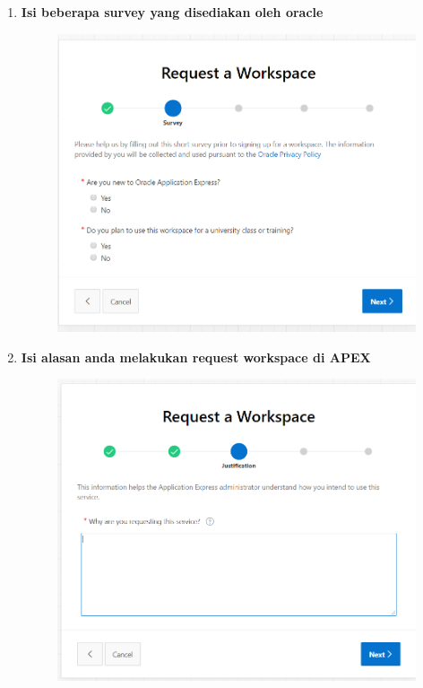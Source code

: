 \begin{enumerate}
\item \textbf{Isi beberapa survey yang disediakan oleh oracle}\begin{figure}[H]
    \centering
    \includegraphics[scale=0.3]{figures/4.png}
    \label{4}
\end{figure}


\item \textbf{Isi alasan anda melakukan request workspace di APEX}
\begin{figure}[H]
    \centering
    \includegraphics[scale=0.3]{figures/5.png}
    \label{5}
\end{figure}



\end{enumerate}
